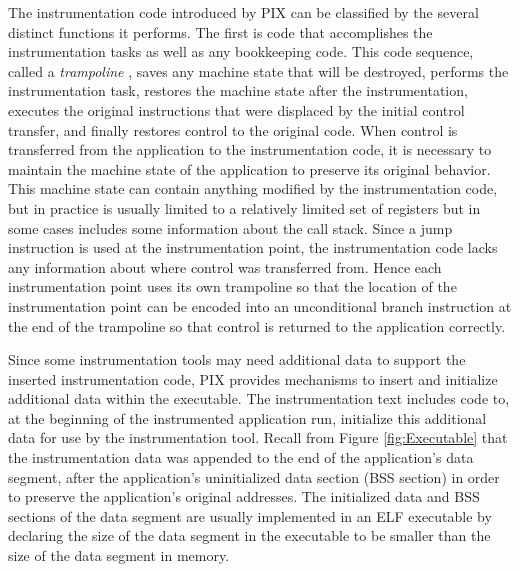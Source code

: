 The instrumentation code introduced by PIX can be classified by the several distinct functions it
performs. The first
is code that accomplishes the instrumentation tasks as well as any bookkeeping code.
This code sequence, called a \textit{trampoline} \cite{buck2000api}, 
saves any machine state that will be destroyed, performs the instrumentation task, restores
the machine state after the instrumentation, executes the
original instructions that were displaced by the initial control transfer,
and finally restores control to the original code. 
When control is transferred from the application to the
instrumentation code, it is necessary to maintain the machine state of
the application to preserve its original behavior. This machine state
can contain anything modified by the instrumentation code, but in practice is
usually limited to a relatively limited set of registers but in some cases includes
some information about the call stack. 
Since a jump instruction is used at the instrumentation point, the
instrumentation code lacks any information about where control was transferred from. Hence
each instrumentation point uses its own trampoline so that the location of the
instrumentation point can be encoded into an unconditional branch instruction
at the end of the trampoline so that control is returned to the application correctly.

Since some instrumentation tools may need additional data to support the inserted instrumentation code,
PIX provides mechanisms to insert and initialize additional data within the executable.
The instrumentation text includes code to, at the beginning of the instrumented 
application run, initialize this additional data for use by the
instrumentation tool. Recall from Figure \ref{fig:Executable} that the instrumentation
data was appended to the end of the application's data segment, after the
application's uninitialized data section (BSS section) in order to preserve the application's 
original addresses. The initialized data and BSS
sections of the data segment are usually implemented in an ELF executable by declaring the size of
the data segment in the executable to be smaller than the size of the data
segment in memory. 

